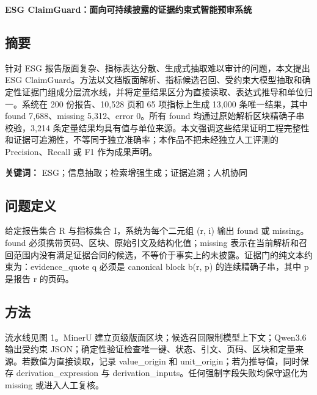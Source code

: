 \documentclass[UTF8,a4paper,11pt]{ctexart}
\begin{document}
\begin{center}
{\fontsize{23}{30}\selectfont\bfseries\sffamily\color{branddark} ESG ClaimGuard：面向可持续披露的证据约束式智能预审系统\par}

\vspace{10mm}
\end{center}
\subsection{摘要}

针对 ESG 报告版面复杂、指标表达分散、生成式抽取难以审计的问题，本文提出 ESG ClaimGuard。方法以文档版面解析、指标候选召回、受约束大模型抽取和确定性证据门组成分层流水线，并将定量结果区分为直接读取、表达式推导和单位归一。系统在 200 份报告、10,528 页和 65 项指标上生成 13,000 条唯一结果，其中 found 7,688、missing 5,312、error 0。所有 found 均通过原始解析区块精确子串校验，3,214 条定量结果均具有值与单位来源。本文强调这些结果证明工程完整性和证据可追溯性，不等同于独立准确率；本作品不把未经独立人工评测的 Precision、Recall 或 F1 作为成果声明。\par

\textbf{关键词：} ESG；信息抽取；检索增强生成；证据追溯；人机协同\par

\subsection{问题定义}

给定报告集合 R 与指标集合 I，系统为每个二元组 (r, i) 输出 found 或 missing。found 必须携带页码、区块、原始引文及结构化值；missing 表示在当前解析和召回范围内没有满足证据合同的候选，不等价于事实上的未披露。证据门的纯文本约束为：evidence\_quote q 必须是 canonical block b(r, p) 的连续精确子串，其中 p 是报告 r 的页码。\par

\subsection{方法}

流水线见图 1。MinerU 建立页级版面区块；候选召回限制模型上下文；Qwen3.6 输出受约束 JSON；确定性验证检查唯一键、状态、引文、页码、区块和定量来源。若数值为直接读取，记录 value\_origin 和 unit\_origin；若为推导值，同时保存 derivation\_expression 与 derivation\_inputs。任何强制字段失败均保守退化为 missing 或进入人工复核。\par
\end{document}
